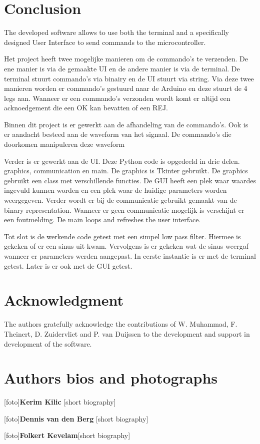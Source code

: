 \documentclass[conference]{IEEEtran}
\begin{document}
\section{Conclusion}
The developed software allows to use both the terminal and a specifically designed User Interface to send commands to the microcontroller.

Het project heeft twee mogelijke manieren om de commando's te verzenden. De ene manier is via de gemaakte UI en de andere manier is via de terminal. De terminal stuurt commando's via binairy en de UI stuurt via string. Via deze twee manieren worden er commando's gestuurd naar de Arduino en deze stuurt de 4 legs aan. Wanneer er een commando's verzonden wordt komt er altijd een acknoedgement die een OK kan bevatten of een REJ.  

Binnen dit project is er gewerkt aan de afhandeling van de commando's. Ook is er aandacht besteed aan de waveform van het signaal. De commando's die doorkomen manipuleren deze waveform

Verder is er gewerkt aan de UI. Deze Python code is opgedeeld in drie delen. graphics, communication en main. De graphics is Tkinter gebruikt. De graphics gebruikt een class met verschillende functies. De GUI heeft een plek waar waardes ingevuld kunnen worden en een plek waar de huidige parameters worden weergegeven. Verder wordt er bij de communicatie gebruikt gemaakt van de binary representation. Wanneer er geen communicatie mogelijk is verschijnt er een foutmelding. De main loops and refreshes the user interface. 

Tot slot is de werkende code getest met een simpel low pass filter. Hiermee is gekeken of er een sinus uit kwam. Vervolgens is er gekeken wat de sinus weergaf wanneer er parameters werden aangepast. In eerste instantie is er met de terminal getest. Later is er ook met de GUI getest.



\section*{Acknowledgment}
The authors gratefully acknowledge the contributions of W. Muhammad, F. Theinert, D. Zuidervliet and P. van Duijssen to the development and support in development of the software.







\section{Authors bios and photographs}

[foto]\textbf{Kerim Kilic} [short biography]

[foto]\textbf{Dennis van den Berg} [short biography]

[foto]\textbf{Folkert Kevelam}[short biography]
\end{document}
